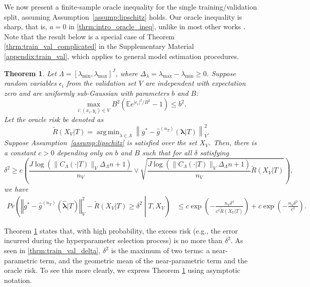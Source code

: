 \documentclass[12pt]{article} %
\newtheorem{theorem}{Theorem}
\theoremstyle{definition}
\DeclareMathOperator*{\argmin}{arg\,min}
\begin{document}
We now present a finite-sample oracle inequality for the single training/validation split, assuming Assumption~\ref{assump:lipschitz} holds.
Our oracle inequality is sharp, that is, $a=0$ in \eqref{thrm:intro_oracle_ineq}, unlike in most other works \citep{gyorfi2002distribution, lecue2012oracle, Van_der_Laan2003-ei}.
Note that the result below is a special case of Theorem \ref{thrm:train_val_complicated} in the Supplementary Material \ref{appendix:train_val}, which applies to general model estimation procedures.
\begin{theorem}
	\label{thrm:train_val}
	Let $\Lambda=[\lambda_{\min},\lambda_{\max}]^{J}$, where $\Delta_{\lambda} = \lambda_{\max} - \lambda_{\min} \ge 0$.
	Suppose random variables $\epsilon_i$ from the validation set $V$ are independent with expectation zero and are uniformly sub-Gaussian with parameters $b$ and $B$:
	$$
	\max_{i: (x_i, y_i) \in V} B^2 \left ( \mathbb{E} e^{|\epsilon_i|^2/B^2} - 1 \right ) \le b^2.
	$$
	Let the oracle risk be denoted as
	\begin{equation}
	\tilde{R}(X_V|T) = \argmin_{\lambda \in \Lambda} \left \| g^*-\hat{g}^{(n_T)}( \boldsymbol{\lambda} | T) \right \|_{V}^{2}.
	\label{eq:tilde_lambda_def}
	\end{equation}
	Suppose Assumption~\ref{assump:lipschitz} is satisfied over the set $X_V$.
	Then, there is a constant $c>0$ depending only on $b$ and $B$ such that for all $\delta$ satisfying
	\begin{equation}
	\delta^{2}
	\ge
	c \left (
	\frac{J \log(\|C_\Lambda(\cdot |T)\|_V \Delta_{\Lambda} n + 1)}{n_{V}}
	\vee
	\sqrt{\frac{J \log(\|C_\Lambda(\cdot |T)\|_V \Delta_{\Lambda} n + 1)}{n_{V}}
		\tilde{R}(X_V|T)}
	\right ),
	\label{thrm:train_val_delta}
	\end{equation}
	we have
	\begin{align}
	Pr\left(
	\left\Vert g^* - \hat{g}^{(n_T)}( \hat{\boldsymbol{\lambda}} | T) \right\Vert _{V}^2 -
	\tilde{R}(X_V|T)
	\ge\delta^2
	\middle |
	T, X_V
	\right )
	&\le c\exp\left(-\frac{n_{V}\delta^{4}}{c^{2} \tilde{R}(X_V|T)}\right)
	+ c\exp\left(-\frac{n_{V}\delta^{2}}{c^{2}}\right).
	\end{align}

\end{theorem}
\noindent
Theorem \ref{thrm:train_val} states that, with high probability, the excess risk (e.g., the error incurred during the hyperparameter selection process) is no more than $\delta^2$.
As seen in \eqref{thrm:train_val_delta}, $\delta^2$ is the maximum of two terms: a near-parametric term, and the geometric mean of the near-parametric term and the oracle risk. To see this more clearly, we express Theorem \ref{thrm:train_val} using asymptotic notation.
\end{document}
